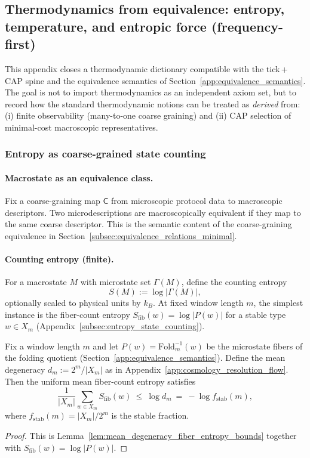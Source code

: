 \subsection{Thermodynamics from equivalence: entropy, temperature, and entropic force (frequency-first)}
\label{app:thermodynamics_from_equivalence}

This appendix closes a thermodynamic dictionary compatible with the tick\,+\,CAP spine and the equivalence semantics of Section~\ref{app:equivalence_semantics}.
The goal is not to import thermodynamics as an independent axiom set, but to record how the standard thermodynamic notions can be treated as \emph{derived} from:
(i) finite observability (many-to-one coarse graining) and
(ii) CAP selection of minimal-cost macroscopic representatives.

\subsubsection{Entropy as coarse-grained state counting}
\label{subsec:entropy_as_counting}

\paragraph{Macrostate as an equivalence class.}
\InterfaceTag Fix a coarse-graining map $\mathsf{C}$ from microscopic protocol data to macroscopic descriptors.
Two microdescriptions are macroscopically equivalent if they map to the same coarse descriptor.
This is the semantic content of the coarse-graining equivalence in Section~\ref{subsec:equivalence_relations_minimal}.

\paragraph{Counting entropy (finite).}
\InterfaceTag For a macrostate $M$ with microstate set $\Gamma(M)$, define the counting entropy
\begin{equation}
\label{eq:counting_entropy}
S(M):=\log|\Gamma(M)|,
\end{equation}
optionally scaled to physical units by $k_B$.
At fixed window length $m$, the simplest instance is the fiber-count entropy $S_{\mathrm{fib}}(w)=\log|P(w)|$ for a stable type $w\in X_m$ (Appendix~\ref{subsec:entropy_state_counting}).

\begin{proposition}\label{prop:mean_fiber_entropy_vs_dm}
\MathTag Fix a window length $m$ and let $P(w)=\mathrm{Fold}_m^{-1}(w)$ be the microstate fibers of the folding quotient (Section~\ref{app:equivalence_semantics}).
Define the mean degeneracy $d_m:=2^m/|X_m|$ as in Appendix~\ref{app:cosmology_resolution_flow}.
Then the uniform mean fiber-count entropy satisfies
\[
\frac{1}{|X_m|}\sum_{w\in X_m} S_{\mathrm{fib}}(w)\ \le\ \log d_m\ =\ -\log f_{\mathrm{stab}}(m),
\]
where $f_{\mathrm{stab}}(m)=|X_m|/2^m$ is the stable fraction.
\end{proposition}
\begin{proof}
This is Lemma~\ref{lem:mean_degeneracy_fiber_entropy_bounds} together with $S_{\mathrm{fib}}(w)=\log|P(w)|$.
\end{proof}

